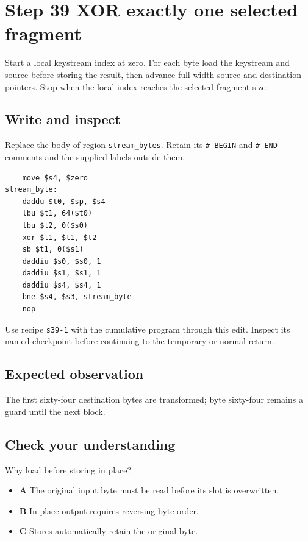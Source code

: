 \section{Step 39 XOR exactly one selected fragment}\label{chacha-s39}

Start a local keystream index at zero. For each byte load the keystream and source before storing the result, then advance full-width source and destination pointers. Stop when the local index reaches the selected fragment size.

\subsection{Write and inspect}
Replace the body of region \texttt{stream\_bytes}. Retain its \texttt{\# BEGIN} and \texttt{\# END} comments and the supplied labels outside them.

\begin{verbatim}
    move $s4, $zero
stream_byte:
    daddu $t0, $sp, $s4
    lbu $t1, 64($t0)
    lbu $t2, 0($s0)
    xor $t1, $t1, $t2
    sb $t1, 0($s1)
    daddiu $s0, $s0, 1
    daddiu $s1, $s1, 1
    daddiu $s4, $s4, 1
    bne $s4, $s3, stream_byte
    nop
\end{verbatim}

Use recipe \texttt{s39-1} with the cumulative program through this edit. Inspect its named checkpoint before continuing to the temporary or normal return.

\subsection{Expected observation}
The first sixty-four destination bytes are transformed; byte sixty-four remains a guard until the next block.

\subsection{Check your understanding}
Why load before storing in place?

\begin{itemize}
  \item \textbf{A} The original input byte must be read before its slot is overwritten.
  \item \textbf{B} In-place output requires reversing byte order.
  \item \textbf{C} Stores automatically retain the original byte.
\end{itemize}
